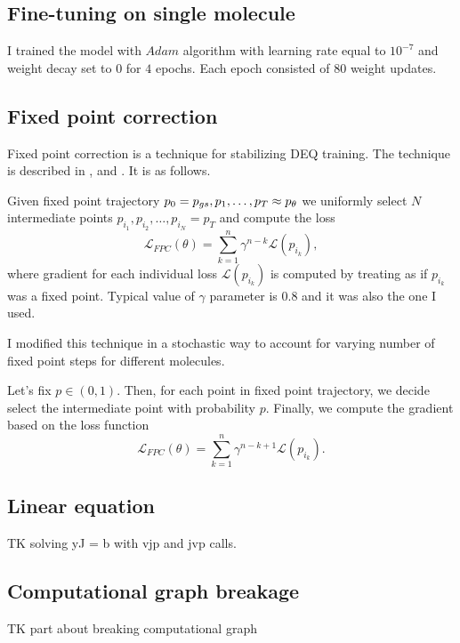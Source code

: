 \documentclass[a4paper,10pt]{report}
\begin{document}
\subsection{Fine-tuning on single molecule}
I trained the model with $Adam$ algorithm with learning rate equal to $10^{-7}$ and weight decay set to $0$ for $4$ epochs. Each epoch consisted of $80$ weight updates.
%

\subsection{Fixed point correction}\label{sec:fpc}
Fixed point correction is a technique for stabilizing DEQ training. The technique is described in \cite{opticalflow}, \cite{geng2023torchdeq}
and \cite{burger2025dequify}. It is as follows.

Given fixed point trajectory $p_0= p_{gs}, p_1,\ldots, p_T\approx  p_\theta $ we uniformly select $N$ intermediate points $p_{i_1}, p_{i_2}, \ldots , p_{i_N}=p_T$ and compute the loss
\begin{equation}
 \mathcal{L}_{FPC}(\theta) = \sum_{k=1}^{n}\gamma^{n-k}\mathcal{L}(p_{i_k}),
\end{equation}
where gradient for each individual loss $\mathcal{L}(p_{i_k})$ is computed by treating as if $p_{i_k}$ was a fixed point. Typical value of $\gamma$ parameter is $0.8$ and it was also the one I used.
\par
I modified this technique in a stochastic way to account for varying number of fixed point steps for different molecules.

Let's fix $p\in (0,1)$. Then, for each point in fixed point trajectory, we decide select the intermediate point with probability $p$.
Finally, we compute the gradient based on the loss function
\begin{equation}
 \mathcal{L}_{FPC}(\theta) = \sum_{k=1}^{n}\gamma^{n-k+1}\mathcal{L}(p_{i_k}).
\end{equation}
\subsection{Linear equation}
TK solving yJ = b with vjp and jvp calls.
\subsection{Computational graph breakage}
TK part about breaking computational graph
\end{document}
